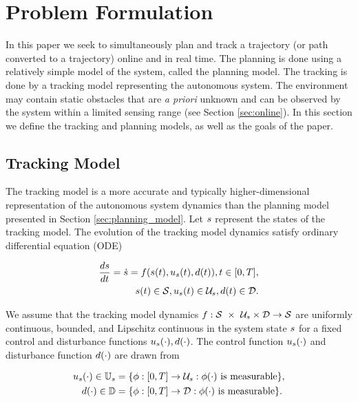 \section{Problem Formulation \label{sec:formulation}}
In this paper we seek to simultaneously plan and track a trajectory (or path converted to a trajectory) online and in real time. 
The planning is done using a relatively simple model of the system, called the planning model. 
The tracking is done by a tracking model representing the autonomous system. 
The environment may contain static obstacles that are \textit{a priori} unknown and can be observed by the system within a limited sensing range (see Section \ref{sec:online}). 
In this section we define the tracking and planning models, as well as the goals of the paper.

\subsection{Tracking  Model}
The tracking model is a more accurate and typically higher-dimensional representation of the autonomous system dynamics than the planning model presented in Section \ref{sec:planning_model}. 
Let $s$ represent the states of the tracking model. 
The evolution of the tracking model dynamics satisfy ordinary differential equation (ODE)

\begin{equation}
\begin{aligned}
\label{eq:tdyn}
\frac{d\tstate}{d\tvar} = \dot{\tstate} = \tdyn(\tstate(\tvar), \tctrl(\tvar), \dstb(\tvar)), \tvar \in [0, \thor], \\
\tstate(\tvar) \in \tset, \tctrl(\tvar) \in \tcset, \dstb(\tvar) \in \dset.
\end{aligned}
\end{equation}

We assume that the tracking model dynamics $f : \mathcal{S}\ \times\ \mathcal{U}_s \times \mathcal{D} \rightarrow \mathcal{S}$ are uniformly continuous, bounded, and Lipschitz continuous in the system state $s$ for a fixed control and disturbance functions $u_s(\cdot), d(\cdot)$. The control function $u_s(\cdot)$ and disturbance function $d(\cdot)$ are drawn from

\begin{align}
u_s(\cdot) \in \mathbb{U}_s &= \{\phi: [0, T] \rightarrow \mathcal{U}_s: \phi(\cdot) \text{ is measurable}\},\\
d(\cdot) \in \mathbb{D} &= \{\phi: [0, T] \rightarrow \mathcal{D}: \phi(\cdot) \text{ is measurable}\}.
\end{align}


